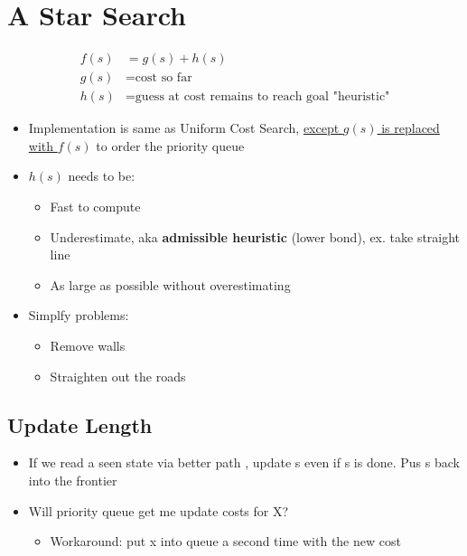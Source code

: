 \section{A Star Search}

  \begin{align*}
    f(s) &= g(s) + h(s) \\
    g(s) &= \text{cost so far} \\
    h(s) &= \text{guess at cost remains to reach goal "heuristic"}
  \end{align*}

  \begin{itemize}
    \item Implementation is same as Uniform Cost Search,
    \ul{except $ g(s) $ is replaced with $ f(s) $} to
    order the priority queue
    \item $ h(s) $ needs to be:
    \begin{itemize}
      \item Fast to compute
      \item Underestimate, aka \textbf{admissible heuristic} (lower bond),
      ex. take straight line
      \item As large as possible without overestimating
    \end{itemize}

    \item Simplfy problems:
    \begin{itemize}
      \item Remove walls
      \item Straighten out the roads
    \end{itemize}
  \end{itemize}

  \subsection{Update Length}

    \begin{itemize}
      \item If we read a seen state via better path , update s even if s is done. Pus s back into the frontier
      \item Will priority queue get me update costs for X?
      \begin{itemize}
        \item Workaround: put x into queue a second time with the new cost
      \end{itemize}
    \end{itemize}

